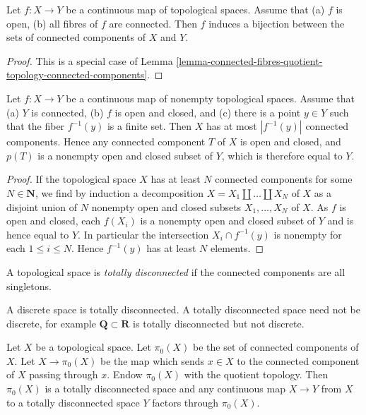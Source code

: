 \begin{lemma}
\label{lemma-connected-fibres-connected-components}
Let $f : X \to Y$ be a continuous map of topological spaces.
Assume that
(a) $f$ is open,
(b) all fibres of $f$ are connected.
Then $f$ induces a bijection between the sets of connected
components of $X$ and $Y$.
\end{lemma}

\begin{proof}
This is a special case of
Lemma \ref{lemma-connected-fibres-quotient-topology-connected-components}.
\end{proof}

\begin{lemma}
\label{lemma-finite-fibre-connected-components}
Let $f : X \to Y$ be a continuous map of nonempty topological spaces. Assume
that
(a) $Y$ is connected,
(b) $f$ is open and closed, and
(c) there is a point $y\in Y$ such that the fiber $f^{-1}(y)$ is a finite set.
Then $X$ has at most $|f^{-1}(y)|$ connected components. Hence any connected 
component $T$ of $X$ is open and closed, and $p(T)$ is a nonempty open and 
closed subset of $Y$, which is therefore equal to $Y$.
\end{lemma}

\begin{proof}
If the topological space $X$ has at least $N$ connected components for some
$N \in \mathbf{N}$, we find by induction a decomposition
$X = X_1 \amalg \ldots \amalg X_N$ of $X$ as a disjoint union of $N$ nonempty
open and closed subsets $X_1, \ldots , X_N$ of $X$. As $f$ is open and closed,
each $f(X_i)$ is a nonempty open and closed subset of $Y$ and is hence equal to
$Y$. In particular the intersection $X_i \cap f^{-1}(y)$ is nonempty for each
$1 \leq i \leq N$. Hence $f^{-1}(y)$ has at least $N$ elements.
\end{proof}

\begin{definition}
\label{definition-totally-disconnected}
A topological space is {\it totally disconnected} if the connected components
are all singletons.
\end{definition}

\noindent
A discrete space is totally disconnected.
A totally disconnected space need not be discrete, for example
$\mathbf{Q} \subset \mathbf{R}$ is totally disconnected but not discrete.

\begin{lemma}
\label{lemma-space-connected-components}
Let $X$ be a topological space. Let $\pi_0(X)$ be the set of connected
components of $X$. Let $X \to \pi_0(X)$ be the map which sends
$x \in X$ to the connected component of $X$ passing through $x$.
Endow $\pi_0(X)$ with the quotient topology. Then $\pi_0(X)$ is a
totally disconnected space and any continuous map $X \to Y$
from $X$ to a totally disconnected space $Y$ factors through $\pi_0(X)$.
\end{lemma}

